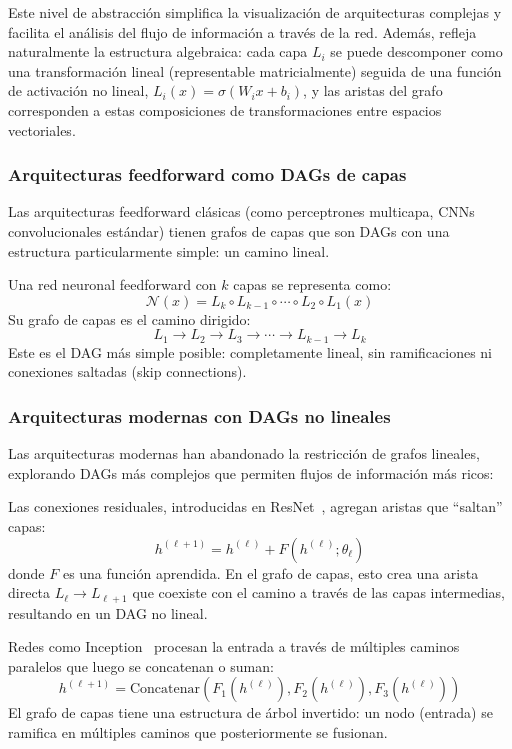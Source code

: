 Este nivel de abstracción simplifica la visualización de arquitecturas complejas y facilita el análisis del flujo de información a través de la red. Además, refleja naturalmente la estructura algebraica: cada capa $L_i$ se puede descomponer como una transformación lineal (representable matricialmente) seguida de una función de activación no lineal, $L_i(x) = \sigma(W_i x + b_i)$, y las aristas del grafo corresponden a estas composiciones de transformaciones entre espacios vectoriales.

\subsubsection[Arquitecturas feedforward como DAGs de capas]{Arquitecturas feedforward como \glspl{DAG} de capas}

Las arquitecturas feedforward clásicas (como perceptrones multicapa, \glspl{CNN} convolucionales estándar) tienen grafos de capas que son \glspl{DAG} con una estructura particularmente simple: un camino lineal.

\begin{example}
Una red neuronal feedforward con $k$ capas se representa como:
\[
\mathcal{N}(x) = L_k \circ L_{k-1} \circ \cdots \circ L_2 \circ L_1(x)
\]
Su grafo de capas es el camino dirigido:
\[
L_1 \to L_2 \to L_3 \to \cdots \to L_{k-1} \to L_k
\]
Este es el \gls{DAG} más simple posible: completamente lineal, sin ramificaciones ni conexiones saltadas (skip connections).
\end{example}

\subsubsection[Arquitecturas modernas con DAGs no lineales]{Arquitecturas modernas con \glspl{DAG} no lineales}

Las arquitecturas modernas han abandonado la restricción de grafos lineales, explorando \glspl{DAG} más complejos que permiten flujos de información más ricos:

Las conexiones residuales, introducidas en ResNet~\citep{he2016deep}, agregan aristas que ``saltan'' capas:
\[
h^{(\ell+1)} = h^{(\ell)} + F(h^{(\ell)}; \theta_\ell)
\]
donde $F$ es una función aprendida. En el grafo de capas, esto crea una arista directa $L_\ell \to L_{\ell+1}$ que coexiste con el camino a través de las capas intermedias, resultando en un \gls{DAG} no lineal.

Redes como Inception~\citep{szegedy2015going} procesan la entrada a través de múltiples caminos paralelos que luego se concatenan o suman:
\[
h^{(\ell+1)} = \text{Concatenar}(F_1(h^{(\ell)}), F_2(h^{(\ell)}), F_3(h^{(\ell)}))
\]
El grafo de capas tiene una estructura de árbol invertido: un nodo (entrada) se ramifica en múltiples caminos que posteriormente se fusionan.


